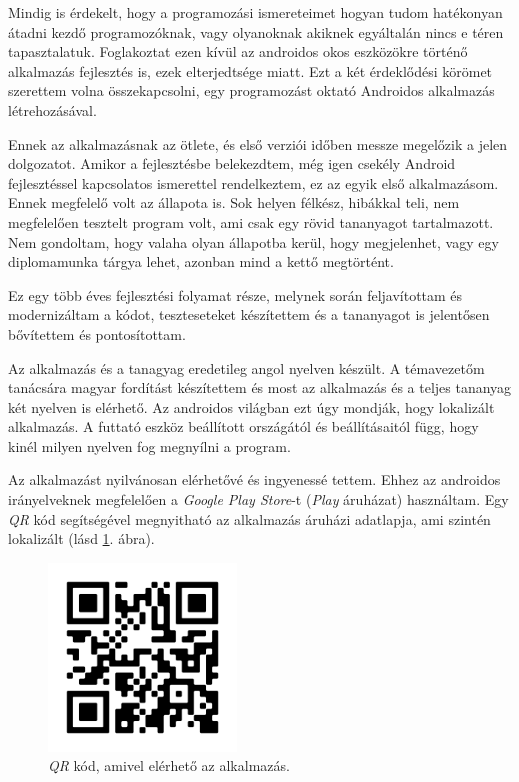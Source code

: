 \documentclass[12pt,a4paper]{article}
\begin{document}
	Mindig is érdekelt, hogy a programozási ismereteimet hogyan tudom hatékonyan átadni kezdő programozóknak, vagy olyanoknak akiknek egyáltalán nincs e téren tapasztalatuk. Foglakoztat ezen kívül az androidos okos eszközökre történő alkalmazás fejlesztés is, ezek elterjedtsége miatt. Ezt a két érdeklődési körömet szerettem volna 
	összekapcsolni, egy programozást oktató Androidos alkalmazás létrehozásával.
	
	Ennek az alkalmazásnak az ötlete, és első verziói időben messze megelőzik a jelen dolgozatot. Amikor a fejlesztésbe belekezdtem, még igen csekély Android fejlesztéssel kapcsolatos ismerettel rendelkeztem, ez az egyik első alkalmazásom. Ennek megfelelő volt az állapota is. Sok helyen félkész, hibákkal teli, nem megfelelően 
	tesztelt program volt, ami csak egy rövid tananyagot tartalmazott. Nem gondoltam, hogy valaha olyan állapotba kerül, hogy megjelenhet, vagy egy diplomamunka tárgya lehet, azonban mind a kettő megtörtént.
	
	Ez egy több éves fejlesztési folyamat része, melynek során feljavítottam és modernizáltam a kódot, teszteseteket készítettem és a tananyagot is jelentősen bővítettem és pontosítottam.
	
	Az alkalmazás és a tanagyag eredetileg angol nyelven készült. A témavezetőm tanácsára magyar fordítást készítettem és most az alkalmazás és a teljes tananyag két nyelven is elérhető. Az androidos világban ezt úgy mondják, hogy lokalizált alkalmazás. A futtató eszköz beállított országától és beállításaitól függ, hogy kinél milyen 
	nyelven fog megnyílni a program.
	
	Az alkalmazást nyilvánosan elérhetővé és ingyenessé tettem. Ehhez az androidos irányelveknek megfelelően a \textit{Google Play Store}-t (\textit{Play} áruházat) használtam. Egy \textit{QR} kód segítségével megnyitható az alkalmazás áruházi adatlapja, ami szintén lokalizált (lásd \ref{qr}. ábra).
	
	 \begin{figure}[h!]
	 	\centering
	 	\includegraphics[width=5cm]{learn_java_qr_code}
	 	\caption{\textit{QR} kód, amivel elérhető az alkalmazás.}
	 	\label{qr}
	 \end{figure}
\end{document}
